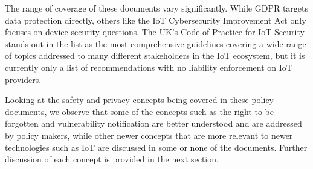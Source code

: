 The range of coverage of these documents vary significantly. While GDPR targets data protection directly, others like the IoT Cybersecurity Improvement Act only focuses on device security questions. The UK’s Code of Practice for IoT Security stands out in the list as the most comprehensive guidelines covering a wide range of topics addressed to many different stakeholders in the IoT ecosystem, but it is currently only a list of recommendations with no liability enforcement on IoT providers.

Looking at the safety and privacy concepts being covered in these policy documents, we observe that some of the concepts such as the right to be forgotten and vulnerability notification are better understood and are addressed by policy makers, while other newer concepts that are more relevant to newer technologies such as IoT are discussed in some or none of the documents. Further discussion of each concept is provided in the next section. 



